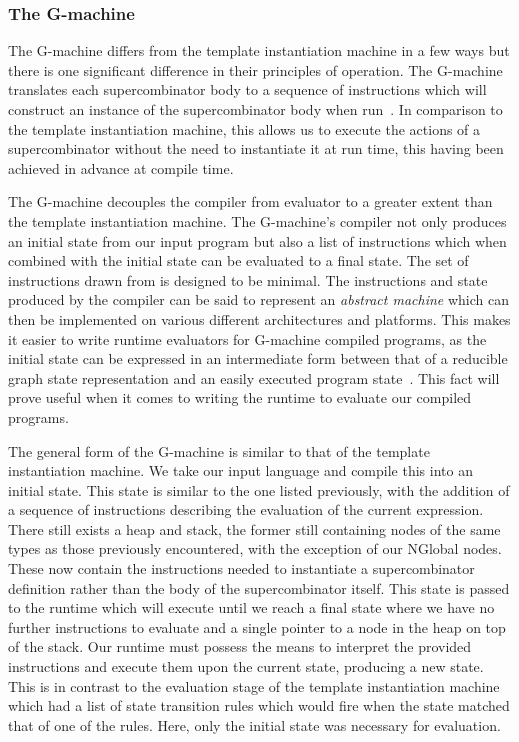 \subsubsection{The G-machine}
The G-machine differs from the template instantiation machine
in a few ways but there is one significant difference in 
their principles of operation. The G-machine translates each
supercombinator body to a sequence of instructions which will
construct an instance of the supercombinator body when run~\cite[pp.86]{Tutorial}.
In comparison to the template instantiation machine, this
allows us to execute the actions of a supercombinator without
the need to instantiate it at run time, this having been
achieved in advance at compile time. 

The G-machine decouples the compiler from evaluator to a
greater extent than the template instantiation machine. The
G-machine's compiler not only produces an initial state from
our input program but also a list of instructions which when
combined with the initial state can be evaluated to a final
state. The set of instructions drawn from is designed to be
minimal. The instructions and state produced
by the compiler can be said to represent an \emph{abstract
machine} which can then be implemented on various different
architectures and platforms. This makes it easier to write
runtime evaluators for G-machine compiled programs, as the
initial state can be expressed in an intermediate form 
between that of a reducible graph state representation 
and an easily executed program state~\cite[pp.294]{SPJ}. 
This fact will prove useful when it comes to writing the
runtime to evaluate our compiled programs.

The general form of the G-machine is similar to that of
the template instantiation machine. We take our input language
and compile this into an initial state. This state is similar
to the one listed previously, with the addition of a sequence
of instructions describing the evaluation of the current expression.
There still exists a heap and stack, the former still containing
nodes of the same types as those previously encountered, with
the exception of our NGlobal nodes. These now contain the 
instructions needed to instantiate a supercombinator definition
rather than the body of the supercombinator itself.
This state is passed to the runtime which will execute until
we reach a final state where we have no further instructions
to evaluate and a single pointer to a node in the heap on top
of the stack. Our runtime must possess the means to interpret 
the provided instructions and execute them upon the current
state, producing a new state. This is in contrast to the 
evaluation stage of the template instantiation machine which
had a list of state transition rules which would fire when
the state matched that of one of the rules. Here, only the
initial state was necessary for evaluation.

